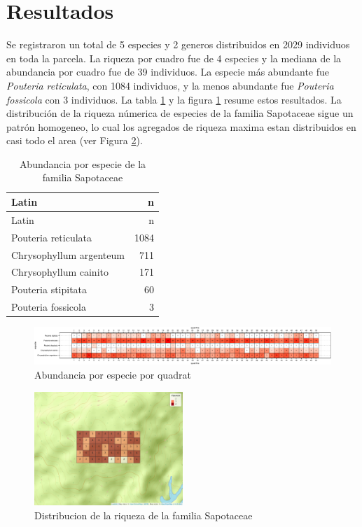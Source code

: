 \documentclass[11pt,]{article}
\begin{document}
\section{Resultados}\label{resultados}

Se registraron un total de 5 especies y 2 generos distribuidos en 2029
individuos en toda la parcela. La riqueza por cuadro fue de 4 especies y
la mediana de la abundancia por cuadro fue de 39 individuos. La especie
más abundante fue \emph{Pouteria reticulata}, con 1084 individuos, y la
menos abundante fue \emph{Pouteria fossicola} con 3 individuos. La tabla
\ref{tab:abun_sp} y la figura \ref{fig:abun_sp_q} resume estos
resultados. La distribución de la riqueza númerica de especies de la
familia Sapotaceae sigue un patrón homogeneo, lo cual los agregados de
riqueza maxima estan distribuidos en casi todo el area (ver Figura
\ref{fig:mapa_cuadros_riq_mi_familia}).

\begin{longtable}[]{@{}lr@{}}
\caption{\label{tab:abun_sp}Abundancia por especie de la familia
Sapotaceae}\tabularnewline
\toprule
Latin & n\tabularnewline
\midrule
\endfirsthead
\toprule
Latin & n\tabularnewline
\midrule
\endhead
Pouteria reticulata & 1084\tabularnewline
Chrysophyllum argenteum & 711\tabularnewline
Chrysophyllum cainito & 171\tabularnewline
Pouteria stipitata & 60\tabularnewline
Pouteria fossicola & 3\tabularnewline
\bottomrule
\end{longtable}

\begin{figure}
\centering
\includegraphics{manuscrito_files/figure-latex/unnamed-chunk-3-1.pdf}
\caption{\label{fig:abun_sp_q}Abundancia por especie por quadrat}
\end{figure}

\begin{figure}
\centering
\includegraphics[width=0.50000\textwidth]{mapa_cuadros_riq_mi_familia.png}
\caption{Distribucion de la riqueza de la familia
Sapotaceae\label{fig:mapa_cuadros_riq_mi_familia}}
\end{figure}
\end{document}
